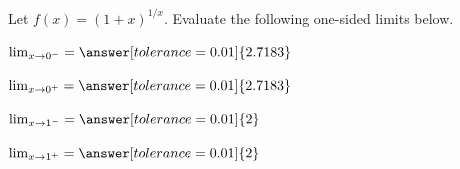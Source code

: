 \documentclass{ximera}
\begin{document}
\begin{question}
Let $f(x) = (1+x)^{1/x}$. Evaluate the following one-sided limits below.	

$\lim_{x \rightarrow {0}^{-}}  = \answer[tolerance=0.01]{2.7183}$

$\lim_{x \rightarrow {0}^{+}} = \answer[tolerance=0.01]{2.7183}$

$\lim_{x \rightarrow {1}^{-}}  = \answer[tolerance=0.01]{2}$
	
$\lim_{x \rightarrow {1}^{+}}  = \answer[tolerance=0.01]{2}$
\end{question}
\end{document}
